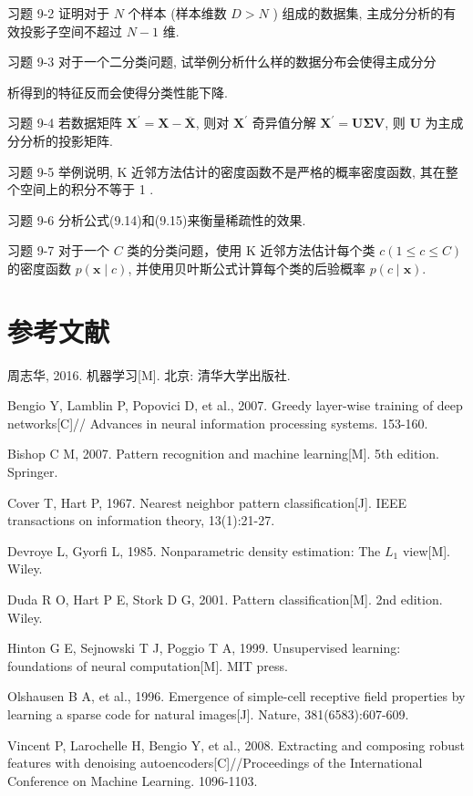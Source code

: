 \documentclass[10pt]{article}
\begin{document}
习题 9-2 证明对于 $N$ 个样本 (样本维数 $D>N$ ) 组成的数据集, 主成分分析的有效投影子空间不超过 $N-1$ 维.

习题 9-3 对于一个二分类问题, 试举例分析什么样的数据分布会使得主成分分

析得到的特征反而会使得分类性能下降.

习题 9-4 若数据矩阵 $\boldsymbol{X}^{\prime}=\boldsymbol{X}-\overline{\boldsymbol{X}}$, 则对 $\boldsymbol{X}^{\prime}$ 奇异值分解 $\boldsymbol{X}^{\prime}=\boldsymbol{U} \boldsymbol{\Sigma} \boldsymbol{V}$, 则 $\boldsymbol{U}$ 为主成分分析的投影矩阵.

习题 9-5 举例说明, $\mathrm{K}$ 近邻方法估计的密度函数不是严格的概率密度函数, 其在整个空间上的积分不等于 1 .

习题 9-6 分析公式(9.14)和(9.15)来衡量稀疏性的效果.

习题 9-7 对于一个 $C$ 类的分类问题，使用 $\mathrm{K}$ 近邻方法估计每个类 $c(1 \leq c \leq C)$的密度函数 $p(\boldsymbol{x} \mid c)$, 并使用贝叶斯公式计算每个类的后验概率 $p(c \mid \boldsymbol{x})$.

\section*{参考文献}
周志华, 2016. 机器学习[M]. 北京: 清华大学出版社.

Bengio Y, Lamblin P, Popovici D, et al., 2007. Greedy layer-wise training of deep networks[C]// Advances in neural information processing systems. 153-160.

Bishop C M, 2007. Pattern recognition and machine learning[M]. 5th edition. Springer.

Cover T, Hart P, 1967. Nearest neighbor pattern classification[J]. IEEE transactions on information theory, 13(1):21-27.

Devroye L, Gyorfi L, 1985. Nonparametric density estimation: The $L_{1}$ view[M]. Wiley.

Duda R O, Hart P E, Stork D G, 2001. Pattern classification[M]. 2nd edition. Wiley.

Hinton G E, Sejnowski T J, Poggio T A, 1999. Unsupervised learning: foundations of neural computation[M]. MIT press.

Olshausen B A, et al., 1996. Emergence of simple-cell receptive field properties by learning a sparse code for natural images[J]. Nature, 381(6583):607-609.

Vincent P, Larochelle H, Bengio Y, et al., 2008. Extracting and composing robust features with denoising autoencoders[C]//Proceedings of the International Conference on Machine Learning. 1096-1103.
\end{document}
